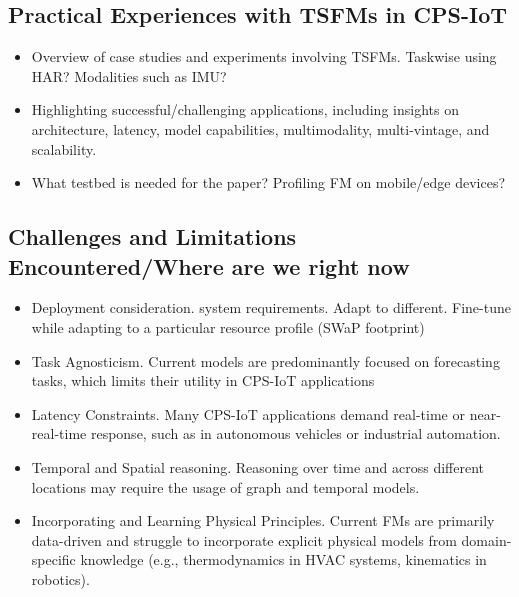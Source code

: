 \subsection{Practical Experiences with TSFMs in CPS-IoT}
\begin{itemize}
    \item Overview of case studies and experiments involving TSFMs. Taskwise using HAR? Modalities such as IMU?
    \item Highlighting successful/challenging applications, including insights on architecture, latency, model capabilities, multimodality, multi-vintage, and scalability.
    \item What testbed is needed for the paper? Profiling FM on mobile/edge devices?
\end{itemize}

\subsection{Challenges and Limitations Encountered/Where are we right now}
\begin{itemize}
    \item Deployment consideration. system requirements. Adapt to different. Fine-tune while adapting to a particular resource profile (SWaP footprint)
    \item Task Agnosticism. Current models are predominantly focused on forecasting tasks, which limits their utility in CPS-IoT applications
    \item  Latency Constraints. Many CPS-IoT applications demand real-time or near-real-time response, such as in autonomous vehicles or industrial automation.
    \item Temporal and Spatial reasoning. Reasoning over time and across different locations may require the usage of graph and temporal models.
    \item Incorporating and Learning Physical Principles. Current FMs are primarily data-driven and struggle to incorporate explicit physical models from domain-specific knowledge (e.g., thermodynamics in HVAC systems, kinematics in robotics).

\end{itemize}

\fi